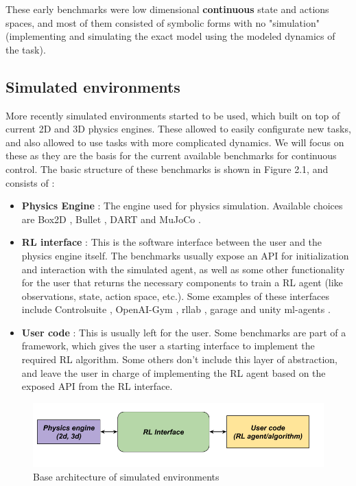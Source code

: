     These early benchmarks were low dimensional \textbf{continuous} state and actions spaces, 
    and most of them consisted of symbolic forms with no "simulation" (implementing and simulating
    the exact model using the modeled dynamics of the task). 

    \subsection{Simulated environments}
    
    More recently simulated environments started to be used, which built on top of current 2D and 3D
    physics engines. These allowed to easily configurate new tasks, and also allowed to use tasks 
    with more complicated dynamics. We will focus on these as they are the basis for the current
    available benchmarks for continuous control. The basic structure of these benchmarks is shown in Figure 2.1, and consists of :

    \begin{itemize}
        \item \textbf{Physics Engine} : The engine used for physics simulation. Available choices are Box2D \citep{Box2D},
                Bullet \citep{Bullet}, DART \citep{DART} and MuJoCo \citep{MuJoCo}.
        \item \textbf{RL interface} : This is the software interface between the user and the physics engine itself. The 
                benchmarks usually expose an API for initialization and interaction with the simulated agent, as well as 
                some other functionality for the user that returns the necessary components to train a RL agent (like observations,
                state, action space, etc.). Some examples of these interfaces include Controlsuite \citep{Controlsuite}, 
                OpenAI-Gym \citep{Gym}, rllab \citep{Rllab}, garage \citep{garage} and unity ml-agents \citep{unity-ml-agents}.
        \item \textbf{User code} : This is usually left for the user. Some benchmarks are part of a framework, which gives the user
                a starting interface to implement the required RL algorithm. Some others don't include this layer of abstraction, and
                leave the user in charge of implementing the RL agent based on the exposed API from the RL interface.
    \end{itemize}

    \begin{figure}[!ht]
	\centering
	\includegraphics[width=4.5in]{./chapters/imgs/img_base_sim_env.png}
	\caption[Basic structure of a simulated environment]{Base architecture of simulated environments}
	\label{fig:sim-env}
    \end{figure}

